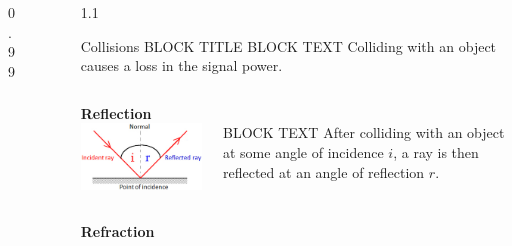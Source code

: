 \documentclass[final]{beamer}
\theoremstyle{plain}
\theoremstyle{definition}
\theoremstyle{remark}
\newlength{\sepwid}
\newlength{\twocolwid}
\newlength{\threecolwid}
\begin{document}
\begin{frame}[t]
\begin{columns}[t]
\begin{column}{0.99\twocolwid}
\end{column} %

\begin{column}{\sepwid}\end{column} %
\begin{column}{\sepwid}\end{column} %
\begin{column}{1.1\threecolwid} %




\begin{block}{Collisions BLOCK TITLE
}
\vspace{-1.5cm}
BLOCK TEXT
Colliding with an object causes a loss in the signal power. 
\vspace{1.5cm}
\begin{columns}
\begin{column}{0.5\linewidth}
\textbf{Reflection} \\
\includegraphics[scale=1]{Reflection.jpg} \cite{Reflection}
\end{column}
\begin{column}{0.5\linewidth}
 \\
 BLOCK TEXT
After colliding with an object at some angle of incidence $i$, a ray is then reflected at an angle of reflection $r$.
\end{column}
\end{columns}
\begin{columns}
\begin{column}{0.5\linewidth}
\textbf{Refraction} \\

\end{column}
\end{columns}
\end{block}
\end{column}
\end{columns}
\end{frame}
\end{document}
